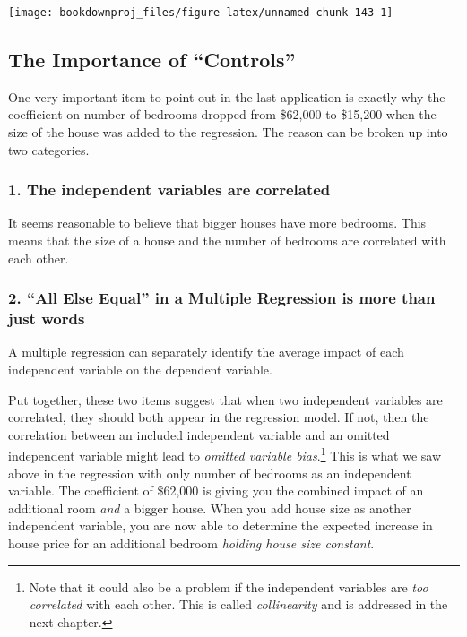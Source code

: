 \documentclass[
]{book}
\begin{document}
\begin{center}\texttt{[image: bookdownproj\_files/figure-latex/unnamed-chunk-143-1]} \end{center}

\subsection{The Importance of ``Controls''}\label{the-importance-of-controls}

One very important item to point out in the last application is exactly why the coefficient on number of bedrooms dropped from \$62,000 to \$15,200 when the size of the house was added to the regression. The reason can be broken up into two categories.

\subsubsection*{1. The independent variables are correlated}\label{the-independent-variables-are-correlated}

It seems reasonable to believe that bigger houses have more bedrooms. This means that the size of a house and the number of bedrooms are correlated with each other.

\subsubsection*{2. ``All Else Equal'' in a Multiple Regression is more than just words}\label{all-else-equal-in-a-multiple-regression-is-more-than-just-words}

A multiple regression can separately identify the average impact of each independent variable on the dependent variable.

Put together, these two items suggest that when two independent variables are correlated, they should both appear in the regression model. If not, then the correlation between an included independent variable and an omitted independent variable might lead to \emph{omitted variable bias}.\footnote{Note that it could also be a problem if the independent variables are \emph{too correlated} with each other. This is called \emph{collinearity} and is addressed in the next chapter.} This is what we saw above in the regression with only number of bedrooms as an independent variable. The coefficient of \$62,000 is giving you the combined impact of an additional room \emph{and} a bigger house. When you add house size as another independent variable, you are now able to determine the expected increase in house price for an additional bedroom \emph{holding house size constant}.
\end{document}
